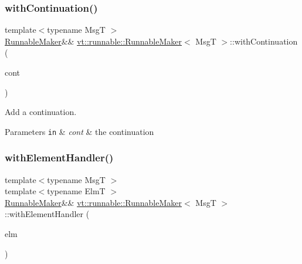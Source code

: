 \subsubsection{\texorpdfstring{with\+Continuation()}{withContinuation()}}
{\footnotesize\ttfamily template$<$typename MsgT $>$ \\
\hyperlink{structvt_1_1runnable_1_1_runnable_maker}{Runnable\+Maker}\&\& \hyperlink{structvt_1_1runnable_1_1_runnable_maker}{vt\+::runnable\+::\+Runnable\+Maker}$<$ MsgT $>$\+::with\+Continuation (\begin{DoxyParamCaption}\item[{\hyperlink{namespacevt_ae0a5a7b18cc99d7b732cb4d44f46b0f3}{Action\+Type}}]{cont }\end{DoxyParamCaption})\hspace{0.3cm}{\ttfamily [inline]}}



Add a continuation. 


\begin{DoxyParams}[1]{Parameters}
\mbox{\tt in}  & {\em cont} & the continuation \\
\hline
\end{DoxyParams}
\mbox{\label{structvt_1_1runnable_1_1_runnable_maker_a1b37afe7a5ab185c29e85e0d6ebbbc82}} 
\subsubsection{\texorpdfstring{with\+Element\+Handler()}{withElementHandler()}}
{\footnotesize\ttfamily template$<$typename MsgT $>$ \\
template$<$typename ElmT $>$ \\
\hyperlink{structvt_1_1runnable_1_1_runnable_maker}{Runnable\+Maker}\&\& \hyperlink{structvt_1_1runnable_1_1_runnable_maker}{vt\+::runnable\+::\+Runnable\+Maker}$<$ MsgT $>$\+::with\+Element\+Handler (\begin{DoxyParamCaption}\item[{ElmT $\ast$}]{elm }\end{DoxyParamCaption})\hspace{0.3cm}{\ttfamily [inline]}}




